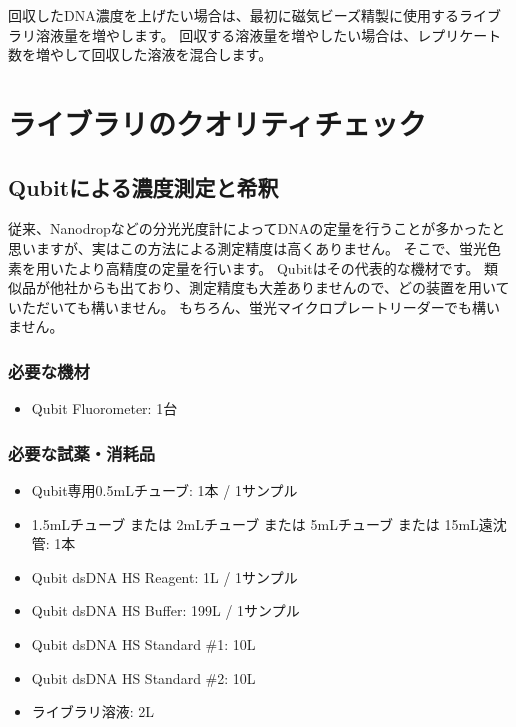 \documentclass[titlepage,10pt,a4paper,uplatex]{jsbook}
\begin{document}
回収したDNA濃度を上げたい場合は、最初に磁気ビーズ精製に使用するライブラリ溶液量を増やします。
回収する溶液量を増やしたい場合は、レプリケート数を増やして回収した溶液を混合します。

\section{ライブラリのクオリティチェック}

\subsection{Qubitによる濃度測定と希釈}

従来、Nanodropなどの分光光度計によってDNAの定量を行うことが多かったと思いますが、実はこの方法による測定精度は高くありません。
そこで、蛍光色素を用いたより高精度の定量を行います。
Qubitはその代表的な機材です。
類似品が他社からも出ており、測定精度も大差ありませんので、どの装置を用いていただいても構いません。
もちろん、蛍光マイクロプレートリーダーでも構いません。

\subsubsection{必要な機材}
\begin{itemize}
\item Qubit Fluorometer: 1台
\end{itemize}

\subsubsection{必要な試薬・消耗品}
\begin{itemize}
\item Qubit専用0.5mLチューブ: 1本 / 1サンプル
\item 1.5mLチューブ または 2mLチューブ または 5mLチューブ または 15mL遠沈管: 1本
\item Qubit dsDNA HS Reagent: 1{\textmu}L / 1サンプル
\item Qubit dsDNA HS Buffer: 199{\textmu}L / 1サンプル
\item Qubit dsDNA HS Standard \#1: 10{\textmu}L
\item Qubit dsDNA HS Standard \#2: 10{\textmu}L
\item ライブラリ溶液: 2{\textmu}L
\end{itemize}
\end{document}
